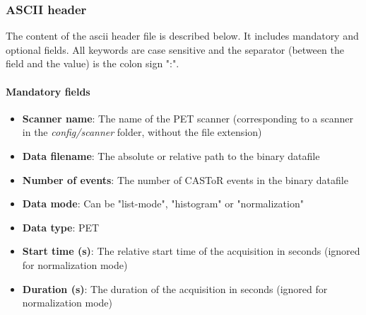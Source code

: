 \documentclass[a4paper, 11pt]{article}
\begin{document}
\subsubsection{ASCII header}

The content of the ascii header file is described below. It includes mandatory and optional fields. All keywords are case sensitive and the
separator (between the field and the value) is the colon sign ":".


\paragraph{Mandatory fields}
\begin{itemize}
  \item \textbf{Scanner name}: The name of the PET scanner (corresponding to a scanner in the \textit{config/scanner} folder, without
        the file extension)
  \item \textbf{Data filename}: The absolute or relative path to the binary datafile
  \item \textbf{Number of events}: The number of CASToR events in the binary datafile
  \item \textbf{Data mode}: Can be "list-mode", "histogram" or "normalization"
  \item \textbf{Data type}: PET
  \item \textbf{Start time (s)}: The relative start time of the acquisition in seconds (ignored for normalization mode)
  \item \textbf{Duration (s)}: The duration of the acquisition in seconds (ignored for normalization mode)
\end{itemize}
\end{document}
